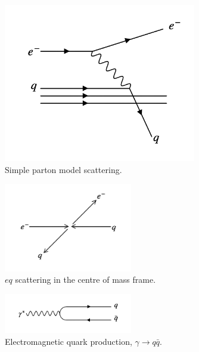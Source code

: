 \begin{figure}[!htb]
  \begin{center}
    \includegraphics[width=0.75\textwidth]{images/web_feynman/image_67.png}
    \caption[Simple parton model scattering]{Simple parton model scattering.}
    \label{fig:ch14_simplePartonDIS}
  \end{center}
\end{figure}

\begin{figure}[!htb]
  \begin{center}
    \includegraphics[width=0.5\textwidth]{images/web_feynman/image_68.png}
    \caption[$eq$ scattering in the centre of mass frame]{$eq$ scattering in the centre of mass frame.}
    \label{fig:ch14_simplePartonDISCM}
  \end{center}
\end{figure}

\begin{figure}[!htb]
  \begin{center}
    \includegraphics[width=0.5\textwidth]{images/web_feynman/image_69.png}
    \caption[Electromagnetic quark production]{Electromagnetic quark production, $\gamma\to q\bar{q}$.}
    \label{fig:ch14_simplePartonDISGammaQQ}
  \end{center}
\end{figure}

